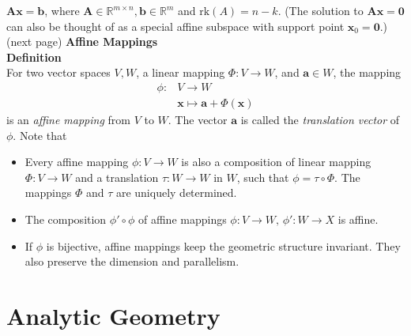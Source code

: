\documentclass{report}
\begin{document}
$\bm{Ax}=\bm{b}$, where $\bm{A}\in\mathbb{R}^{m\times n},\bm{b}\in\mathbb{R}^m$ and $\text{rk}(A)=n-k$. 
(The solution to $\bm{Ax}=\mathbf{0}$ can also be thought of as a special affine subspace with support 
point $\bm{x}_0=\mathbf{0}$.)\\
(next page)
\newpage
\noindent\textbf{Affine Mappings}\\
\textbf{Definition}\\
For two vector spaces $V,W$, a linear mapping $\Phi:V\to W$, and $\bm{a}\in W$, the mapping
\begin{align*}
\phi:&V\to W\\
&\bm{x}\mapsto\bm{a}+\Phi(\bm{x})
\end{align*}
is an \textit{affine mapping} from $V$ to $W$. The vector $\bm{a}$ is called the 
\textit{translation vector} of $\phi$.
Note that
\begin{itemize}
\item Every affine mapping $\phi:V\to W$ is also a composition of linear mapping
$\Phi:V\to W$ and a translation $\tau:W\to W$ in $W$, such that $\phi=\tau\circ\Phi$. The mappings $\Phi$ and $\tau$
are uniquely determined.
\item The composition $\phi'\circ\phi$ of affine mappings
$\phi:V\to W,\,\phi':W\to X$ is affine.
\item If $\phi$ is bijective, affine mappings keep the geometric structure invariant. They also
preserve the dimension and parallelism.
\end{itemize}
\newpage

\section{Analytic Geometry}
\end{document}
